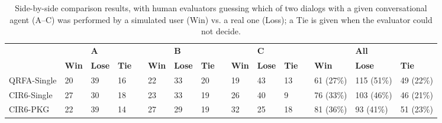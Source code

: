 \begin{table*}[t]
	\caption{Side-by-side comparison results, with human evaluators guessing which of two dialogs with a given conversational agent (A--C) was performed by a simulated user (Win) vs. a real one (Loss); a Tie is given when the evaluator could not decide.}
	\captionshrink
	\begin{tabular}{llllllllllllllll}
	\toprule
	  & & \textbf{A} &&&& \textbf{B} &&&& \textbf{C} &&&& \textbf{All} \\
	  \cline{2-4} \cline{6-8} \cline{10-12} \cline{14-16}
	 	  & \textbf{Win} & \textbf{Lose} & \textbf{Tie} &&\textbf{Win} & \textbf{Lose} & \textbf{Tie} && \textbf{Win} & \textbf{Lose} & \textbf{Tie}  && \textbf{Win} & \textbf{Lose} & \textbf{Tie}\\
	\midrule
	 QRFA-Single & 20 & 39 & 16 && 22 & 33 & 20 && 19 & 43 & 13 && 61 (27\%) & 115 (51\%) & 49 (22\%) \\
	 CIR6-Single & 27 & 30 & 18 && 23 & 33 & 19 && 26 & 40 & 9 && 76 (33\%) & 103 (46\%) & 46 (21\%) \\
	 CIR6-PKG  & 22 & 39 & 14 && 27 & 29 & 19 && 32 & 25 & 18 && 81 (36\%) & 93 (41\%) & 51 (23\%) \\
	\bottomrule
	\end{tabular}
	\shrink
\label{tbl:human}
\end{table*}